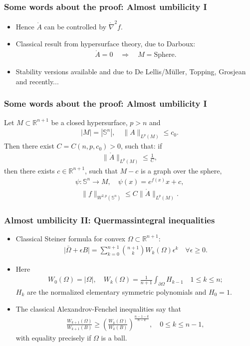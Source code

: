 \documentclass{beamer}
\newcommand{\cn}{\colon}
\newcommand{\sub}{\subset}
\newcommand{\mr}{\mathring}
\newcommand{\bbR}{\mathbb{R}}
\newcommand{\bbS}{\mathbb{S}}
\newcommand{\8}{\infty}
\newcommand{\ep}{\epsilon}
\newcommand{\Om}{\Omega}
\newcommand{\cU}{\mathcal{U}}
\newcommand{\del}{\partial}
\newcommand{\n}{\nabla}
\newcommand{\fa}{\forall}
\newcommand{\fr}[2]{\frac{#1}{#2}}
\newcommand{\tfr}[2]{\tfrac{#1}{#2}}
\newcommand{\eq}[1]{\begin{equation}\begin{alignedat}{2} #1 \end{alignedat}\end{equation}}
\newcommand{\br}[1]{\left(#1\right)}
\newcommand{\abs}[1]{\lvert #1\rvert}
\newcommand{\Ra}{\Rightarrow}
\newcommand{\ra}{\rightarrow}
\newcommand{\q}{\quad}
\begin{document}
\begin{frame} 
\frametitle{Some words about the proof: Almost umbilicity I}
\begin{itemize}
\item[] Hence $\mr{A}$ can be controlled by $\mr\n^{2} f$.
\item[] Classical result from hypersurface theory, due to Darboux:
\eq{\mr{A}=0\q\Ra\q M = \mbox{Sphere}.}
\item[] Stability versions available and due to De Lellis/M\"uller, Topping, Grosjean and recently...
\end{itemize}
\end{frame}

\begin{frame} 
\frametitle{Some words about the proof: Almost umbilicity I}

\begin{theorem}
Let $M\sub \bbR^{n+1}$ be a closed hypersurface, $p>n$ and 
\eq{|M| = |\bbS^{n}|,\q \|A\|_{L^{p}(M)}\leq c_{0}.}
Then there exist $C = C(n,p,c_{0})>0$, such that: if
\eq{\|\mr{A}\|_{L^{p}(M)}\leq \tfr 1C,}
then there exists $c\in \bbR^{n+1}$, such that $M - c$ is a graph over the sphere, 
\eq{\psi\cn \bbS^{n} \ra M,\q \psi(x) = e^{f(x)}x+c,}
 \eq{\|f\|_{W^{2,p}(\bbS^{n})}\leq C\|\mr{A}\|_{L^{p}(M)}.}
\end{theorem}

\end{frame}




\begin{frame} 
\frametitle{Almost umbilicity II: Quermassintegral inequalities }
\begin{itemize}
	\item[] Classical Steiner formula for convex $\Om\sub\bbR^{n+1}$:
\eq{\abs{\bar\Om+\ep B}=\sum_{k=0}^{n+1}\binom{n+1}{k}W_{k}(\Om)\ep^{k}\q\fa \ep\geq 0.}
\item[] Here
\eq{W_{0}(\Om)=\abs{\Om},\q W_{k}(\Om)=\fr{1}{n+1}\int_{\del\Om}H_{k-1}\q 1\leq k\leq n;}
$H_{k}$ are the normalized elementary symmetric polynomials and $H_{0}=1$.
\item[]
The classical Alexandrov-Fenchel inequalities say that
\eq{\fr{W_{k+1}(\Om)}{W_{k+1}(B)}\geq \br{\fr{W_{k}(\Om)}{W_{k}(B)}}^{\fr{n-1-k}{n-k}},\q 0\leq k\leq n-1,}
with equality precisely if $\Om$ is a ball. \end{itemize}
\end{frame}
\end{document}
